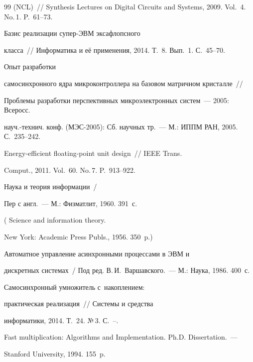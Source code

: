 {{\begin{thebibliography}{99}
(NCL)~/\!\!/ Synthesis Lectures on Digital Circuits and Systems, 2009. Vol.~4. No.\,1. P.~61--73.


 Базис реализации супер-ЭВМ эксафлопсного

класса~/\!\!/ Информатика и её применения, 2014. Т.~8. Вып.~1. С.~45--70.


 Опыт разработки

самосинхронного ядра микроконтроллера на базовом матричном крис\-тал\-ле~/\!\!/

Проб\-ле\-мы разработки перспективных микроэлектронных систем~--- 2005: Всеросс.

науч.-технич. конф. (МЭС-2005): Сб. научных тр.~--- М.: ИППМ РАН, 2005. С.~235--242.


 Energy-efficient floating-point unit design~/\!\!/ IEEE Trans.

Comput., 2011. Vol.~60. No.\,7. P.~913--922.


 Наука и теория информации~/

Пер с англ.~--- М.: Физматлит, 1960. 391~с.

(  {Science and information theory}.

New York: Academic Press Publs., 1956. 350~p.)


 Автоматное управление асинхронными процессами в ЭВМ и

дискретных системах~/ Под ред. В.\,И.~Варшавского.~--- М.: Наука, 1986. 400~с.



Самосинхронный умножитель с~накоплением:

практическая реализация~/\!\!/  Системы и средства

информатики, 2014. Т.~24. №\,3. С.~\pageref{step2}--\pageref{step2-end}.


 Fast multiplication: Algorithms and Implementation. Ph.D. Dissertation.~---

Stanford University, 1994. 155~p.

\end{thebibliography}

} }





